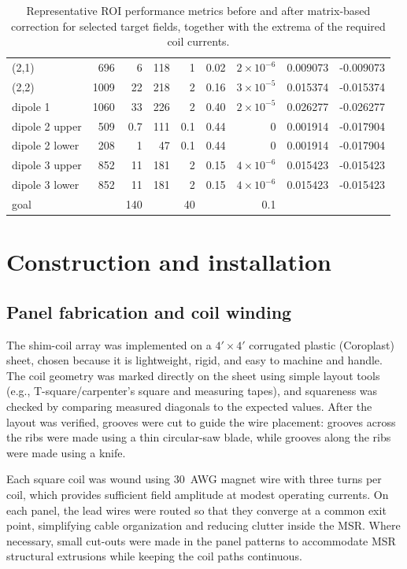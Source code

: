 \documentclass[preprint,12pt]{elsarticle}
\begin{document}
\begin{table}[tbp]
{\begin{tabular}{lrrrrrrrr}
(2,1)          & 696  & 6    & 118 & 1   & 0.02   & $2\times10^{-6}$ & 0.009073 & -0.009073 \\
(2,2)          & 1009 & 22   & 218 & 2   & 0.16   & $3\times10^{-5}$ & 0.015374 & -0.015374 \\
dipole 1       & 1060 & 33   & 226 & 2   & 0.40   & $2\times10^{-5}$ & 0.026277 & -0.026277 \\
dipole 2 upper & 509  & 0.7  & 111 & 0.1 & 0.44   & 0                & 0.001914 & -0.017904 \\
dipole 2 lower & 208  & 1    & 47  & 0.1 & 0.44   & 0                & 0.001914 & -0.017904 \\
dipole 3 upper & 852  & 11   & 181 & 2   & 0.15   & $4\times10^{-6}$ & 0.015423 & -0.015423 \\
dipole 3 lower & 852  & 11   & 181 & 2   & 0.15   & $4\times10^{-6}$ & 0.015423 & -0.015423 \\
\hline
goal           &      & 140  &      & 40  &        & 0.1              &          &          \\
\hline
\end{tabular}%
}
\caption{Representative ROI performance metrics before and after matrix-based correction for selected target fields, together with the extrema of the required coil currents.}
\label{tab:roi_metrics}
\end{table}

\section{Construction and installation}\label{sec6}

\subsection{Panel fabrication and coil winding}

The shim-coil array was implemented on a $4'\times4'$ corrugated plastic (Coroplast) sheet, chosen because it is lightweight, rigid, and easy to machine and handle. The coil geometry was marked directly on the sheet using simple layout tools (e.g., T-square/carpenter’s square and measuring tapes), and squareness was checked by comparing measured diagonals to the expected values. After the layout was verified, grooves were cut to guide the wire placement: grooves across the ribs were made using a thin circular-saw blade, while grooves along the ribs were made using a knife.

Each square coil was wound using 30~AWG magnet wire with three turns per coil, which provides sufficient field amplitude at modest operating currents. On each panel, the lead wires were routed so that they converge at a common exit point, simplifying cable organization and reducing clutter inside the MSR. Where necessary, small cut-outs were made in the panel patterns to accommodate MSR structural extrusions while keeping the coil paths continuous.
\end{document}
